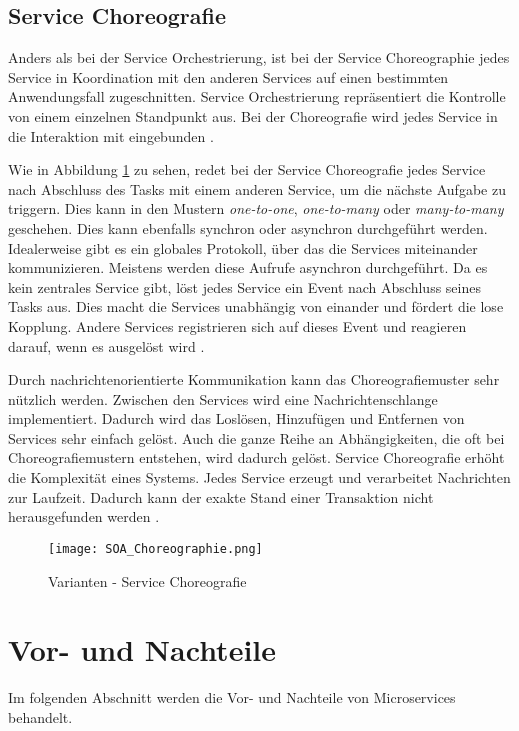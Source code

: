 \subsection{Service Choreografie}
Anders als bei der Service Orchestrierung, ist bei der Service Choreographie jedes Service in Koordination mit den anderen Services auf einen bestimmten Anwendungsfall zugeschnitten.
Service Orchestrierung repräsentiert die Kontrolle von einem einzelnen Standpunkt aus. Bei der Choreografie wird jedes Service in die Interaktion mit eingebunden \cite[Kapitel 3]{PracticalMicroservices}. 

Wie in Abbildung \ref{fig:SOA_Choreographie} zu sehen, redet bei der Service Choreografie jedes Service nach Abschluss des Tasks mit einem anderen Service, um die nächste Aufgabe zu triggern. Dies kann in den Mustern \textit{one-to-one}, \textit{one-to-many} oder \textit{many-to-many} geschehen. Dies kann ebenfalls synchron oder asynchron durchgeführt werden. Idealerweise gibt es ein globales Protokoll, über das die Services miteinander kommunizieren. Meistens werden diese Aufrufe asynchron durchgeführt. Da es kein zentrales Service gibt, löst jedes Service ein Event nach Abschluss seines Tasks aus. Dies macht die Services unabhängig von einander und fördert die lose Kopplung. Andere Services registrieren sich auf dieses Event und reagieren darauf, wenn es ausgelöst wird \cite[Kapitel 3]{PracticalMicroservices}. 

Durch nachrichtenorientierte Kommunikation kann das Choreografiemuster sehr nützlich werden. Zwischen den Services wird eine Nachrichtenschlange implementiert. Dadurch wird das Loslösen, Hinzufügen und Entfernen von Services sehr einfach gelöst. Auch die ganze Reihe an Abhängigkeiten, die oft bei Choreografiemustern entstehen, wird dadurch gelöst. Service Choreografie erhöht die Komplexität eines Systems. Jedes Service erzeugt und verarbeitet Nachrichten zur Laufzeit. Dadurch kann der exakte Stand einer Transaktion nicht herausgefunden werden \cite[Kapitel 3]{PracticalMicroservices}.

\begin{figure}[H]
	\begin{center}
		\texttt{[image: SOA\_Choreographie.png]}
		\caption[Varianten - Service Choreografie]{Varianten - Service Choreografie}
		\cite[Kapitel 3]{PracticalMicroservices}
		\label{fig:SOA_Choreographie}
	\end{center}
\end{figure}

\section{Vor- und Nachteile}
Im folgenden Abschnitt werden die Vor- und Nachteile von Microservices behandelt.

